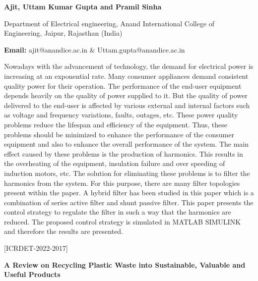 \documentclass[twoside,11pt]{amsart}
\begin{document}
\centerline{\textbf{Ajit, Uttam Kumar Gupta and Pramil Sinha  }}
\vskip 5mm
\begin{flushleft}
Department of Electrical engineering, Anand International College of Engineering, Jaipur,
Rajasthan (India)
\vskip 5mm
\end{flushleft}
\vskip 2mm
\begin{flushleft}
{\bf Email:} ajit@anandice.ac.in \& Uttam.gupta@anandice.ac.in
\end{flushleft}
\vskip 5mm
Nowadays with the advancement of technology, the demand for electrical power is increasing at
an exponential rate. Many consumer appliances demand consistent quality power for their operation. The
performance of the end-user equipment depends heavily on the quality of power supplied to it. But the quality
of power delivered to the end-user is affected by various external and internal factors such as voltage and
frequency variations, faults, outages, etc. These power quality problems reduce the lifespan and efficiency of
the equipment. Thus, these problems should be minimized to enhance the performance of the consumer
equipment and also to enhance the overall performance of the system. The main effect caused by these
problems is the production of harmonics. This results in the overheating of the equipment, insulation failure
and over speeding of induction motors, etc. The solution for eliminating these problems is to filter the
harmonics from the system. For this purpose, there are many filter topologies present within the paper. A
hybrid filter has been studied in this paper which is a combination of series active filter and shunt passive
filter. This paper presents the control strategy to regulate the filter in such a way that the harmonics are
reduced. The proposed control strategy is simulated in MATLAB SIMULINK and therefore the results are
presented.
\newpage
\vskip 5mm
\begin{flushleft}
\centerline{[ICRDET-2022-2017]}
\end{flushleft}
\begin{center}\bf\LARGE
A Review on Recycling Plastic Waste into Sustainable, Valuable
and Useful Products
\end{center}
\vskip 5mm
\end{document}
